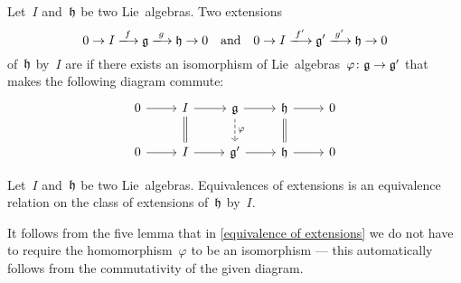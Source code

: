 \begin{definition}
  \label{equivalence of extensions}
  Let~$I$ and~$\mathfrak{h}$ be two Lie~algebras.
  Two extensions
  \[
    0 
    \to
    I
    \xlongto{f}
    \glie
    \xlongto{g}
    \hlie
    \to
    0
    \quad\text{and}\quad
    0 
    \to
    I
    \xlongto{f'}
    \glie'
    \xlongto{g'}
    \hlie
    \to
    0
  \]
  of~$\mathfrak{h}$ by~$I$ are  if there exists an isomorphism of Lie~algebras~$\varphi \colon \mathfrak{g} \to \mathfrak{g}'$ that makes the following diagram commute:
  \[
    \begin{tikzcd}
      0
      \arrow{r}
      &
      I
      \arrow{r}
      \arrow[equal]{d}
      &
      \glie
      \arrow{r}
      \arrow[dashed]{d}[right]{\varphi}
      &
      \hlie
      \arrow{r}
      \arrow[equal]{d}
      &
      0
      \\
      0
      \arrow{r}
      &
      I
      \arrow{r}
      &
      \glie'
      \arrow{r}
      &
      \hlie
      \arrow{r}
      &
      0
    \end{tikzcd}
  \]
\end{definition}


\begin{lemma}
  Let~$I$ and~$\mathfrak{h}$ be two Lie~algebras.
  Equivalences of extensions is an equivalence relation on the class of extensions of~$\mathfrak{h}$ by~$I$.
\end{lemma}


\begin{remark}
  It follows from the five lemma that in \cref{equivalence of extensions} we do not have to require the homomorphism~$\varphi$ to be an isomorphism --- this automatically follows from the commutativity of the given diagram.
\end{remark}


